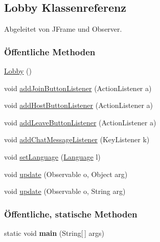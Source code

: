 \hypertarget{a00016}{\subsection{Lobby Klassenreferenz}
\label{a00016}
}


Abgeleitet von J\-Frame und Observer.

\subsubsection*{Öffentliche Methoden}
\begin{DoxyCompactItemize}
\item 
\hypertarget{a00016_a84b656bea5258a736aab56ccb65b1dc5}{\hyperlink{a00016_a84b656bea5258a736aab56ccb65b1dc5}{Lobby} ()}\label{a00016_a84b656bea5258a736aab56ccb65b1dc5}

\item 
void \hyperlink{a00016_a4c19f7e1cf18bb9a26458694250c5a42}{add\-Join\-Button\-Listener} (Action\-Listener a)
\item 
void \hyperlink{a00016_a9fbb7f8143ab566bcc3139443c52f504}{add\-Host\-Button\-Listener} (Action\-Listener a)
\item 
void \hyperlink{a00016_aac8c97a2425ab3702a82bb0876aa3cc8}{add\-Leave\-Button\-Listener} (Action\-Listener a)
\item 
void \hyperlink{a00016_a1d0d058b74950bbf7305be79b1d60143}{add\-Chat\-Message\-Listener} (Key\-Listener k)
\item 
void \hyperlink{a00016_a9329ba7453dd661d50d2fb8024df3b2b}{set\-Language} (\hyperlink{a00015}{Language} l)
\item 
void \hyperlink{a00016_a2b67d42550fdf9ddd8f3878d0849965c}{update} (Observable o, Object arg)
\item 
void \hyperlink{a00016_a41caffb40957934b02960cf166c78494}{update} (Observable o, String arg)
\end{DoxyCompactItemize}
\subsubsection*{Öffentliche, statische Methoden}
\begin{DoxyCompactItemize}
\item 
\hypertarget{a00016_a8b260eecbaabcef8473fd87ada040682}{static void {\bfseries main} (String\mbox{[}$\,$\mbox{]} args)}\label{a00016_a8b260eecbaabcef8473fd87ada040682}

\end{DoxyCompactItemize}
